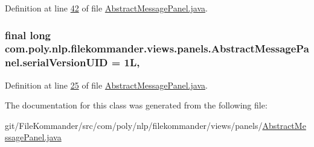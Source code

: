 Definition at line \hyperlink{L42}{42} of file \hyperlink{}{Abstract\-Message\-Panel.\-java}.

\hypertarget{classcom_1_1poly_1_1nlp_1_1filekommander_1_1views_1_1panels_1_1_abstract_message_panel_a865c3834ea52d557283acefd0d2c855c}{
\subsubsection[{serial\-Version\-U\-I\-D}]{\setlength{\rightskip}{0pt plus 5cm}final long com.\-poly.\-nlp.\-filekommander.\-views.\-panels.\-Abstract\-Message\-Panel.\-serial\-Version\-U\-I\-D = 1\-L\hspace{0.3cm}{\ttfamily [static]}, {\ttfamily [private]}}}\label{classcom_1_1poly_1_1nlp_1_1filekommander_1_1views_1_1panels_1_1_abstract_message_panel_a865c3834ea52d557283acefd0d2c855c}


Definition at line \hyperlink{L25}{25} of file \hyperlink{}{Abstract\-Message\-Panel.\-java}.



The documentation for this class was generated from the following file\-:\begin{DoxyCompactItemize}
\item 
git/\-File\-Kommander/src/com/poly/nlp/filekommander/views/panels/\hyperlink{_abstract_message_panel_8java}{Abstract\-Message\-Panel.\-java}\end{DoxyCompactItemize}
